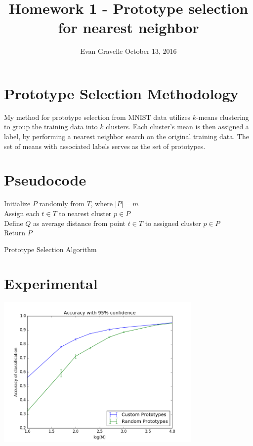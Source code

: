 \documentclass[letterpaper,10pt,onecolumn]{IEEEconf}
\begin{document}
\title{Homework 1 - Prototype selection for nearest neighbor}
\author{Evan Gravelle \quad \quad October 13, 2016}
\maketitle

\section{Prototype Selection Methodology}

My method for prototype selection from MNIST data utilizes $k$-means clustering to group the training data into $k$ clusters. Each cluster's mean is then assigned a label, by performing a nearest neighbor search on the original training data. The set of means with associated labels serves as the set of prototypes.

\section{Pseudocode}

\begin{algorithm}[H]
\SetAlgoLined
\DontPrintSemicolon
{}
\BlankLine
Initialize $P$ randomly from $T$, where $|P| = m$ \\
Assign each $t \in T$ to nearest cluster $p \in P$ \\
Define $Q$ as average distance from point $t \in T$ to assigned cluster $p \in P$ \\
Return $P$
\caption{Prototype Selection Algorithm}
\end{algorithm}

\section{Experimental}

\begin{center}\label{fig:plot}
\includegraphics[width=10cm]{errorbars.png}
\end{center}
\end{document}
